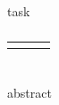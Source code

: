 \cleardoubleoddpage%
{task}%
\cleardoubleoddpage
\vspace*{\fill}
%
%
\subsection*{\TransAuthorshipDeclTitle}

\TransAuthorshipDeclText{}

\makeatletter
\vspace{1.5cm}%
\begin{center}
	\begin{tabular}{M{12em}M{4em}M{12em}}
		{\textit{\@author}} & & \textit{\TransPlaceDate{}}\\
	\end{tabular}
\end{center}
\makeatother%

\cleardoublepage
\chapter*{\abstractname}%
{abstract}%
\tableofcontents%
\addchap{\glossaryname}%

